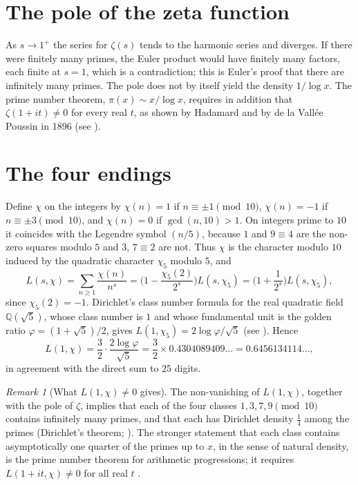 \documentclass[11pt]{amsart}
\theoremstyle{remark}
\newtheorem{remark}[proposition]{Remark}
\begin{document}
\section{The pole of the zeta function}\label{sec:pole}

As $s\to1^{+}$ the series for $\zeta(s)$ tends to the harmonic series and diverges. If there were finitely many primes, the Euler product would have finitely many factors, each finite at $s=1$, which is a contradiction; this is Euler's proof that there are infinitely many primes. The pole does not by itself yield the density $1/\log x$. The prime number theorem, $\pi(x)\sim x/\log x$, requires in addition that $\zeta(1+it)\ne0$ for every real $t$, as shown by Hadamard and by de la Vall\'ee Poussin in 1896 (see \cite{Apostol1976,Davenport1980}).

\section{The four endings}\label{sec:endings}

Define $\chi$ on the integers by $\chi(n)=1$ if $n\equiv\pm1\pmod{10}$, $\chi(n)=-1$ if $n\equiv\pm3\pmod{10}$, and $\chi(n)=0$ if $\gcd(n,10)>1$. On integers prime to $10$ it coincides with the Legendre symbol $(n/5)$, because $1$ and $9\equiv4$ are the non-zero squares modulo $5$ and $3$, $7\equiv2$ are not. Thus $\chi$ is the character modulo $10$ induced by the quadratic character $\chi_5$ modulo $5$, and
\[
L(s,\chi)=\sum_{n\ge1}\frac{\chi(n)}{n^s}=\Big(1-\frac{\chi_5(2)}{2^s}\Big)L(s,\chi_5)=\Big(1+\frac1{2^s}\Big)L(s,\chi_5),
\]
since $\chi_5(2)=-1$. Dirichlet's class number formula for the real quadratic field $\mathbb{Q}(\sqrt5)$, whose class number is $1$ and whose fundamental unit is the golden ratio $\varphi=(1+\sqrt5)/2$, gives $L(1,\chi_5)=2\log\varphi/\sqrt5$ (see \cite{Davenport1980}). Hence
\[
L(1,\chi)=\frac32\cdot\frac{2\log\varphi}{\sqrt5}=\frac32\times0.4304089409\ldots=0.6456134114\ldots,
\]
in agreement with the direct sum to $25$ digits.

\begin{remark}[What $L(1,\chi)\ne0$ gives]
The non-vanishing of $L(1,\chi)$, together with the pole of $\zeta$, implies that each of the four classes $1,3,7,9\pmod{10}$ contains infinitely many primes, and that each has Dirichlet density $\tfrac14$ among the primes (Dirichlet's theorem; \cite{Davenport1980}). The stronger statement that each class contains asymptotically one quarter of the primes up to $x$, in the sense of natural density, is the prime number theorem for arithmetic progressions; it requires $L(1+it,\chi)\ne0$ for all real $t$ \cite{Davenport1980}.
\end{remark}
\end{document}
